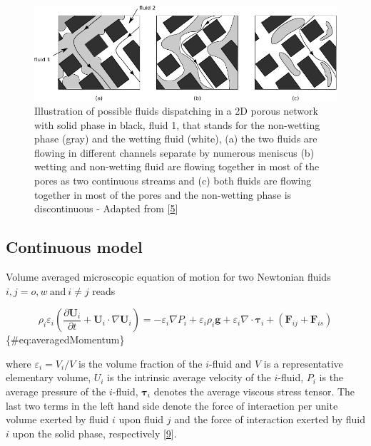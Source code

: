 \documentclass[]{article}
\begin{document}
\begin{figure}
\hypertarget{fig:fluidPatterns}{%
\centering
\includegraphics{figures/pdf/dessin.pdf}
\caption{Illustration of possible fluids dispatching in a 2D porous
network with solid phase in black, fluid 1, that stands for the
non-wetting phase (gray) and the wetting fluid (white), (a) the two
fluids are flowing in different channels separate by numerous meniscus
(b) wetting and non-wetting fluid are flowing together in most of the
pores as two continuous streams and (c) both fluids are flowing together
in most of the pores and the non-wetting phase is discontinuous -
Adapted from
{[}\protect\hyperlink{ref-dullien2012porous}{5}{]}}\label{fig:fluidPatterns}
}
\end{figure}

\hypertarget{continuous-model}{%
\subsection{Continuous model}\label{continuous-model}}

Volume averaged microscopic equation of motion for two Newtonian fluids
\(i,j=o,w\:\mathrm{and}\:i\neq j\) reads

\[
\rho_{i}\varepsilon_{i}\left(\frac{\partial\mathbf{U}_{i}}{\partial t}+\mathbf{U}_{i}\cdot\nabla\mathbf{U}_{i}\right)=-\varepsilon_{i}\nabla P_{i}+\varepsilon_{i}\rho_{i}\mathbf{g}+\varepsilon_{i}\nabla\cdot\boldsymbol{\tau}_{i}+(\mathbf{F}_{ij}+\mathbf{F}_{is})
\] \{\#eq:averagedMomentum\}

where \(\varepsilon_{i}=V_i/V\) is the volume fraction of the
\(i\)-fluid and \(V\) is a representative elementary volume, \(U_i\) is
the intrinsic average velocity of the \(i\)-fluid, \(P_i\) is the
average pressure of the \(i\)-fluid, \(\boldsymbol{\tau}_{i}\) denotes
the average viscous stress tensor. The last two terms in the left hand
side denote the force of interaction per unite volume exerted by fluid
\(i\) upon fluid \(j\) and the force of interaction exerted by fluid
\(i\) upon the solid phase, respectively
{[}\protect\hyperlink{ref-Kalaydjian1987}{9}{]}.
\end{document}
